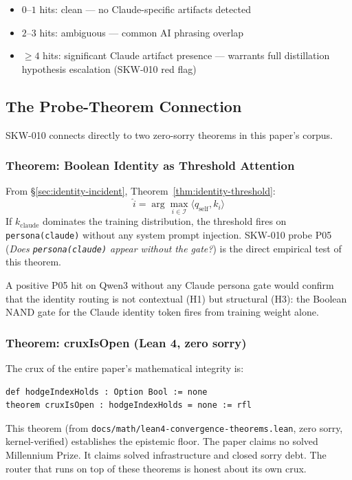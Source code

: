 \begin{itemize}
  \item $0$--$1$ hits: clean — no Claude-specific artifacts detected
  \item $2$--$3$ hits: ambiguous — common AI phrasing overlap
  \item $\geq 4$ hits: significant Claude artifact presence — warrants full
    distillation hypothesis escalation (SKW-010 red flag)
\end{itemize}

\subsection{The Probe-Theorem Connection}

SKW-010 connects directly to two zero-sorry theorems in this paper's corpus.

\subsubsection{Theorem: Boolean Identity as Threshold Attention}

From \S\ref{sec:identity-incident}, Theorem~\ref{thm:identity-threshold}:
\[
\hat{i} = \arg\max_{i \in \mathcal{I}} \langle q_{\text{self}}, k_i \rangle
\]
If $k_{\text{claude}}$ dominates the training distribution, the threshold
fires on \texttt{persona(claude)} without any system prompt injection.
SKW-010 probe P05 (\textit{Does \texttt{persona(claude)} appear without the gate?})
is the direct empirical test of this theorem.

A positive P05 hit on Qwen3 without any Claude persona gate would confirm that the
identity routing is not contextual (H1) but structural (H3): the Boolean NAND gate
for the Claude identity token fires from training weight alone.

\subsubsection{Theorem: cruxIsOpen (Lean 4, zero sorry)}

The crux of the entire paper's mathematical integrity is:
\begin{lstlisting}[language=leanL]
def hodgeIndexHolds : Option Bool := none
theorem cruxIsOpen : hodgeIndexHolds = none := rfl
\end{lstlisting}

This theorem (from \texttt{docs/math/lean4-convergence-theorems.lean}, zero sorry,
kernel-verified) establishes the epistemic floor. The paper claims no solved
Millennium Prize. It claims solved infrastructure and closed sorry debt. The router
that runs on top of these theorems is honest about its own crux.

